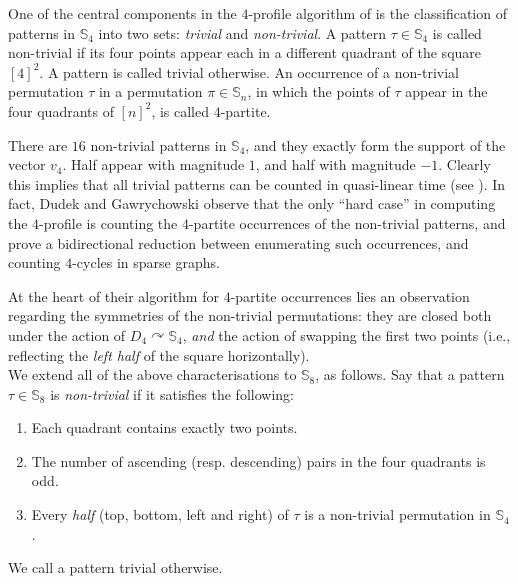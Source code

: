 \documentclass{article}
\theoremstyle{remark}
\def\acts{\curvearrowright}
\theoremstyle{plain}
\begin{document}
One of the central components in the $4$-profile algorithm of \cite{dudek2020counting} is the 
classification of patterns in $\mathbb{S}_4$ into two sets: \textit{trivial} and \textit{non-trivial}.
A pattern $\tau \in \mathbb{S}_4$ is called non-trivial
if its four points appear each in a different quadrant of the square $[4]^2$.
A pattern is called trivial otherwise.
An occurrence of a non-trivial permutation $\tau$ in a permutation $\pi \in \mathbb{S}_n$, in which
the points of $\tau$ appear in the four quadrants of $[n]^2$, is called $4$-partite.

There are $16$ non-trivial patterns in $\mathbb{S}_4$, and they exactly form the support of the vector $v_4$.
Half appear with magnitude $1$, and half with magnitude $-1$. Clearly this implies that all trivial patterns
can be counted in quasi-linear time (see ).
In fact, Dudek and Gawrychowski \cite{dudek2020counting} observe that the only ``hard case'' in computing the $4$-profile
is counting the $4$-partite occurrences of the non-trivial patterns, 
and prove a  bidirectional reduction between enumerating such occurrences, and counting $4$-cycles in sparse graphs.

At the heart of their algorithm for $4$-partite occurrences
lies an observation regarding the symmetries of the non-trivial permutations:
they are closed both under the action of $D_4 \acts \mathbb{S}_4$,
\textit{and} the action of swapping the first two points
(i.e., reflecting the \textit{left half} of the square horizontally). \ \\

We extend all of the above characterisations to $\mathbb{S}_8$, as follows.
Say that a pattern $\tau \in \mathbb{S}_8$ is \textit{non-trivial} if it
satisfies the following:

\begin{enumerate}
    \item Each quadrant contains exactly two points.
    \item The number of ascending (resp. descending) pairs in the four quadrants is odd.
    \item Every \textit{half} (top, bottom, left and right) of $\tau$ is a non-trivial permutation in $\mathbb{S}_4$.
\end{enumerate}
We call a pattern trivial otherwise.
\end{document}
